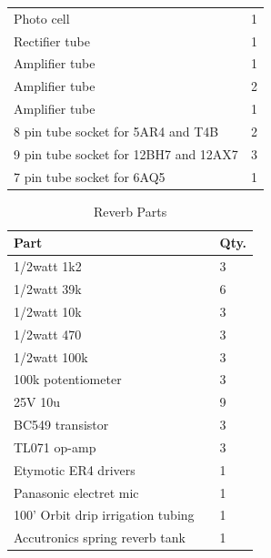 \documentclass[journal]{IEEEtran}
\begin{document}
\begin{table}[]
\begin{tabular}{l|l}
			Photo cell                            & 1          \\
			Rectifier tube                        & 1          \\
			Amplifier tube                        & 1          \\
			Amplifier tube                        & 2          \\
			Amplifier tube                        & 1          \\
			8 pin tube socket for 5AR4 and T4B    & 2          \\
			9 pin tube socket for 12BH7 and 12AX7 & 3          \\
			7 pin tube socket for 6AQ5            & 1         
		\end{tabular}
	\end{table}
	
	\begin{table}[]
		\centering
		\caption{Reverb Parts}
		\label{tab:reverbParts}
		\begin{tabular}{ll|l}
			Part                             &  & Qty. \\ \hline
			
			1/2watt 1k2                               &  & 3          \\
			1/2watt 39k                               &  & 6          \\
			1/2watt 10k                               &  & 3          \\
			1/2watt 470                               &  & 3          \\
			1/2watt 100k                              &  & 3          \\
			100k potentiometer                &  & 3          \\
			25V 10u                               &  & 9          \\
			BC549 transistor                  &  & 3          \\
			TL071 op-amp                      &  & 3          \\
			Etymotic ER4 drivers              &  & 1          \\
			Panasonic electret mic            &  & 1          \\
			100' Orbit drip irrigation tubing &  & 1          \\
			Accutronics spring reverb tank    &  & 1         
		\end{tabular}
	\end{table}
\end{document}
